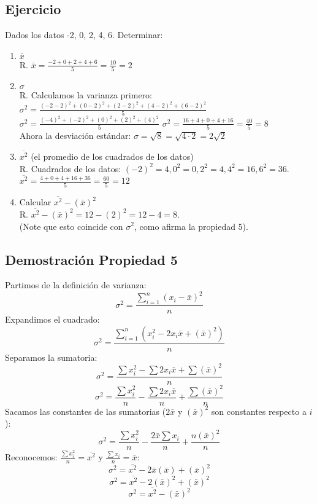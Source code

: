 \documentclass[12pt, letterpaper]{article}
\begin{document}
\subsection{Ejercicio}
Dados los datos -2, 0, 2, 4, 6. Determinar:
\begin{enumerate}
    \item $\bar{x}$ \\
        R. $\bar{x} = \frac{-2+0+2+4+6}{5} = \frac{10}{5} = 2$ \\
    \item $\sigma$ \\
        R. Calculamos la varianza primero:
        $\sigma^2 = \frac{(-2-2)^2+(0-2)^2+(2-2)^2+(4-2)^2+(6-2)^2}{5}$
        $\sigma^2 = \frac{(-4)^2+(-2)^2+(0)^2+(2)^2+(4)^2}{5}$
        $\sigma^2 = \frac{16+4+0+4+16}{5} = \frac{40}{5} = 8$ \\
        Ahora la desviación estándar: $\sigma = \sqrt{8} = \sqrt{4 \cdot 2} = 2\sqrt{2}$ \\
    \item $\overline{x^2}$ (el promedio de los cuadrados de los datos) \\
        R. Cuadrados de los datos: $(-2)^2=4, 0^2=0, 2^2=4, 4^2=16, 6^2=36$.
        $\overline{x^2} = \frac{4+0+4+16+36}{5} = \frac{60}{5} = 12$ \\
    \item Calcular $\overline{x^2}-(\bar{x})^2$ \\
        R. $\overline{x^2}-(\bar{x})^2 = 12 - (2)^2 = 12 - 4 = 8$. \\
        (Note que esto coincide con $\sigma^2$, como afirma la propiedad 5).
\end{enumerate}

\subsection{Demostración Propiedad 5}
Partimos de la definición de varianza:
\[\sigma^2=\frac{\sum_{i=1}^{n} (x_i-\bar{x})^2}{n}\]
Expandimos el cuadrado:
\[\sigma^2=\frac{\sum_{i=1}^{n} (x_i^2 - 2x_i\bar{x} + (\bar{x})^2)}{n}\]
Separamos la sumatoria:
\[\sigma^2=\frac{\sum x_i^2 - \sum 2x_i\bar{x} + \sum (\bar{x})^2}{n}\]
\[\sigma^2=\frac{\sum x_i^2}{n} - \frac{\sum 2x_i\bar{x}}{n} + \frac{\sum (\bar{x})^2}{n}\]
Sacamos las constantes de las sumatorias ($2\bar{x}$ y $(\bar{x})^2$ son constantes respecto a $i$):
\[\sigma^2=\frac{\sum x_i^2}{n} - \frac{2\bar{x} \sum x_i}{n} + \frac{n(\bar{x})^2}{n}\]
Reconocemos: $\frac{\sum x_i^2}{n} = \overline{x^2}$ y $\frac{\sum x_i}{n} = \bar{x}$:
\[\sigma^2=\overline{x^2} - 2\bar{x} (\bar{x}) + (\bar{x})^2\]
\[\sigma^2=\overline{x^2} - 2(\bar{x})^2 + (\bar{x})^2\]
\[\sigma^2=\overline{x^2} - (\bar{x})^2\]
\newpage
\end{document}
